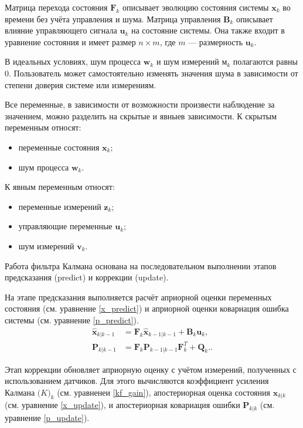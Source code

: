 Матрица перехода состояния \(\mathbf{F}_k\) описывает эволюцию состояния системы \(\mathbf{x}_k\) во времени без учёта управления и шума.
Матрица управления \(\mathbf{B}_k\) описывает влияние управляющего сигнала \(\mathbf{u}_k\) на состояние системы. Она также входит в уравнение состояния и имеет размер \(n \times m\), где \(m\) --- размерность \(\mathbf{u}_k\).

В идеальных условиях, шум процесса \(\mathbf{w}_k\) и шум измерений \(\mathbf{м}_k\)
полагаются равны 0. Пользователь может самостоятельно изменять 
значения шума в зависимости от степени доверия системе или измерениям.


Все переменные, в зависимости от возможности произвести наблюдение за значением,
можно разделить на скрытые и явныев зависимости.
К скрытым переменным относят:
\begin{itemize}
    \item переменные состояния $\mathbf{x}_k$; 
    \item шум процесса $\mathbf{w}_k$.
\end{itemize}

К явным переменным относят:
\begin{itemize}
    \item переменные измерений $\mathbf{z}_k$; 
    \item управляющие переменные $\mathbf{u}_k$; 
    \item шум измерений $\mathbf{v}_k$.
\end{itemize}

Работа фильтра Калмана основана на последовательном выполнении этапов предсказания (predict) и 
коррекции (update).

На этапе предсказания выполняется расчёт 
априорной оценки переменных состояния (см. уравнение \ref{x_predict})
и априорной оценки ковариация ошибка системы (см. уравнение \ref{p_predict}).
\begin{align}
\hat{\mathbf{x}}_{k|k-1} &= \mathbf{F}_k \hat{\mathbf{x}}_{k-1|k-1} + \mathbf{B}_k \mathbf{u}_k, \label{x_predict}\\
\mathbf{P}_{k|k-1} &= \mathbf{F}_k \mathbf{P}_{k-1|k-1} \mathbf{F}_k^T + \mathbf{Q}_k. \label{p_predict}.
\end{align}

Этап коррекции обновляет априорную оценку с учётом измерений, полученных с использованием датчиков.
Для этого вычисляются коэффициент усиления Калмана \(\mathbf(K)_k\) (см. уравненеи \ref{kf_gain}),
апостериорная оценка состояния \(\mathbf{x}_{k|k}\) (см. уравнение \ref{x_update}),
и апостериорная ковариация ошибки \(\mathbf{P}_{k|k}\) (см. уравнение \ref{p_update}).

